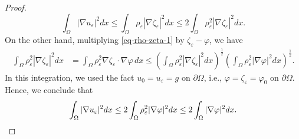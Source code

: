 \documentclass[a4paper,10pt,reqno]{amsart}
\theoremstyle{definition}
\newcommand{\ve}{{\varepsilon}}
\newcommand{\vp}{{\varphi}}
\newcommand{\Om}{{\Omega}}
\newcommand{\pa}{\partial}
\numberwithin{equation}{section}
\begin{document}
\begin{proof}
\[ \int_\Om |\nabla u_\varepsilon|^2 dx \le  \int_\Omega \rho_\ve  |\nabla  \zeta_\varepsilon |^2   dx \le  2  \int_\Omega \rho_\ve^2  |\nabla  \zeta_\varepsilon |^2   dx.
\]
On the other hand, multiplying \eqref{eq-rho-zeta-1} by $\zeta_\ve -\vp$, we have
\begin{align*}
 \int_\Om \rho_\ve^2 |\nabla \zeta_\ve|^2 dx & =   \int_\Om \rho_\ve^2   \nabla \zeta_\ve \cdot \nabla \vp \, dx \le \left(  \int_\Om \rho_\ve^2 |\nabla \zeta_\ve|^2 dx \right)^{\frac12}  \left(  \int_\Om \rho_\ve^2 |\nabla \vp |^2 dx \right)^{\frac12}.
 \end{align*}
 In this integration, we used the fact   $u_0=u_\varepsilon = g$ on $\partial \Omega$,  i.e., $\vp=\zeta_\ve=\vp_0$ on $\pa \Om$.
 Hence, we conclude that
 \[ \int_\Om |\nabla u_\varepsilon|^2 dx \le 2   \int_\Om \rho_\ve^2 |\nabla \vp |^2 dx \le 2    \int_\Om  |\nabla \vp |^2 dx .
 \qedhere
 \]
\end{proof}
\end{document}
